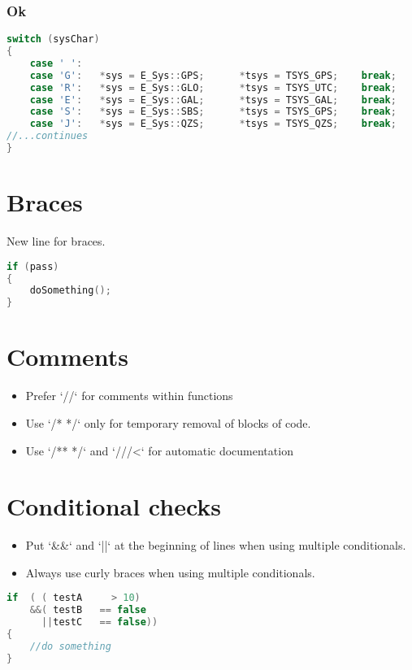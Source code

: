 \subsubsection{Ok}	

\begin{lstlisting}[language=c++]
switch (sysChar)
{
    case ' ':
    case 'G':   *sys = E_Sys::GPS;      *tsys = TSYS_GPS;    break;
    case 'R':   *sys = E_Sys::GLO;      *tsys = TSYS_UTC;    break;
    case 'E':   *sys = E_Sys::GAL;      *tsys = TSYS_GAL;    break;
    case 'S':   *sys = E_Sys::SBS;      *tsys = TSYS_GPS;    break;
    case 'J':   *sys = E_Sys::QZS;      *tsys = TSYS_QZS;    break;
//...continues
}
\end{lstlisting}

\section{Braces}

New line for braces.
\begin{lstlisting}[language=c++]
if (pass)
{
    doSomething();
}
\end{lstlisting}

\section{Comments}

\begin{itemize}
\item Prefer `//` for comments within functions
\item Use `/* */` only for temporary removal of blocks of code.
\item Use `/** */` and `///<` for automatic documentation
\end{itemize}

\section{Conditional checks}
%
\begin{itemize}
\item  Put `\&\&` and `||` at the beginning of lines when using multiple conditionals.
\item  Always use curly braces when using multiple conditionals.
\end{itemize}
%
\begin{lstlisting}[language=c++]
if  ( ( testA     > 10)
    &&( testB   == false
      ||testC   == false))
{
    //do something
}
\end{lstlisting}

